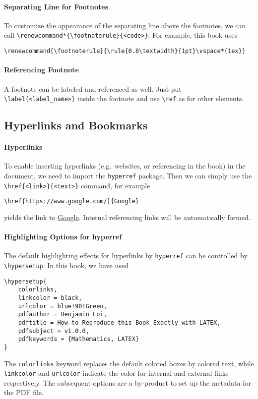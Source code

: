 \paragraph{Separating Line for Footnotes} 
To customize the appearance of the separating line above the footnotes, we can call \texttt{\textbackslash renewcommand*\{\textbackslash footnoterule\}\allowbreak\{<code>\}}. For example, this book uses
\begin{lstlisting}
\renewcommand{\footnoterule}{\rule{0.8\textwidth}{1pt}\vspace*{1ex}}
\end{lstlisting}

\paragraph{Referencing Footnote}
A footnote can be labeled and referenced as well. Just put \texttt{\textbackslash label\{<label\_name>\}} inside the footnote and use \texttt{\textbackslash ref} as for other elements.

\subsection{Hyperlinks and Bookmarks}

\paragraph{Hyperlinks} 
To enable inserting hyperlinks (e.g.\ websites, or referencing in the book) in the document, we need to import the \texttt{hyperref} package. Then we can simply use the \texttt{\textbackslash href\{<link>\}\allowbreak\{<text>\}} command, for example
\begin{lstlisting}
\href{https://www.google.com/}{Google}
\end{lstlisting}
yields the link to \href{https://www.google.com/}{Google}. Internal referencing links will be automatically formed.

\paragraph{Highlighting Options for hyperref} The default highlighting effects for hyperlinks by \texttt{hyperref} can be controlled by \texttt{\textbackslash hypersetup}. In this book, we have used
\begin{lstlisting}
\hypersetup{
    colorlinks,
    linkcolor = black,
    urlcolor = blue!90!Green,
    pdfauthor = Benjamin Loi,
    pdftitle = How to Reproduce this Book Exactly with LATEX,
    pdfsubject = v1.0.0,
    pdfkeywords = {Mathematics, LATEX}
}
\end{lstlisting}
The \texttt{colorlinks} keyword replaces the default colored boxes by colored text, while \texttt{linkcolor} and \texttt{urlcolor} indicate the color for internal and external links respectively. The subsequent options are a by-product to set up the metadata for the PDF file.

